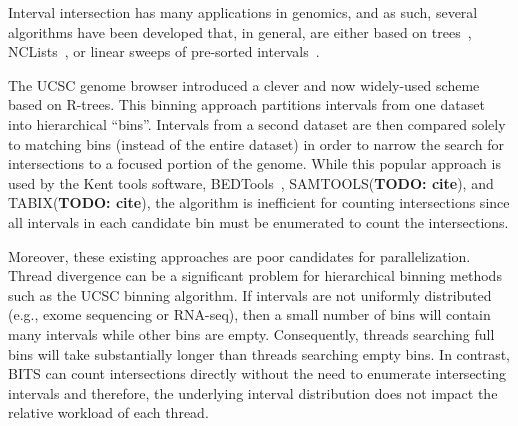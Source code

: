\documentclass{bioinfo}
\begin{document}
        Interval intersection has many applications in genomics, and 
        as such, several algorithms have been developed that, in general,
        are either based on trees~\citep{kent2002}, 
        NCLists~\citep{alekseyenko2007}, or linear sweeps of 
        pre-sorted intervals~\citep{richardson2006}.
        
        The UCSC genome browser introduced a clever and now widely-used 
        scheme based on R-trees. This binning approach partitions intervals 
        from one dataset into hierarchical ``bins''.  Intervals from a second 
        dataset are then compared solely to matching bins (instead of the 
        entire dataset) in order to narrow the search for intersections to 
        a focused portion of the genome.  While this popular approach is 
        used by the Kent tools software, BEDTools~\citep{quinlan2010}, 
        SAMTOOLS(\textbf{TODO: cite}), and TABIX(\textbf{TODO: cite}), the 
        algorithm is inefficient for counting intersections since all intervals
        in each candidate bin must be enumerated to count the intersections.
        
        Moreover, these existing approaches are poor candidates for
        parallelization.  Thread divergence can be a significant problem for
        hierarchical binning methods such as the UCSC binning algorithm.  
        If intervals are not uniformly distributed (e.g., exome sequencing 
        or RNA-seq), then a small number of bins will contain many intervals
        while other bins are empty. Consequently, threads searching full bins
        will take substantially longer than threads searching empty bins.  In
        contrast, BITS can count intersections directly without the need 
        to enumerate intersecting intervals and therefore, the underlying
        interval distribution does not impact the relative workload of each thread.
\end{document}
